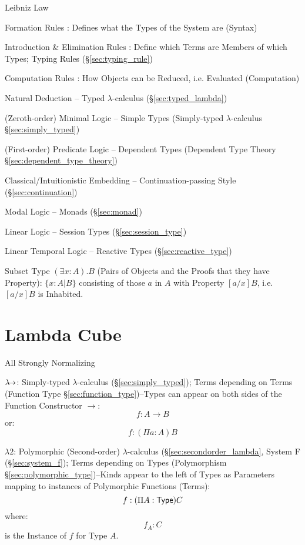 Leibniz Law


\asterism


Formation Rules : Defines what the Types of the System are (Syntax)

Introduction \& Elimination Rules : Define which Terms are Members of
which Types; Typing Rules (\S\ref{sec:typing_rule})

Computation Rules : How Objects can be Reduced, i.e. Evaluated
(Computation)

Natural Deduction -- Typed $\lambda$-calculus
(\S\ref{sec:typed_lambda})

(Zeroth-order) Minimal Logic -- Simple Types (Simply-typed
$\lambda$-calculus \S\ref{sec:simply_typed})

(First-order) Predicate Logic -- Dependent Types (Dependent Type
Theory \S\ref{sec:dependent_type_theory})

Classical/Intuitionistic Embedding -- Continuation-passing Style
(\S\ref{sec:continuation})

Modal Logic -- Monads (\S\ref{sec:monad})

Linear Logic -- Session Types (\S\ref{sec:session_type})

Linear Temporal Logic -- Reactive Types (\S\ref{sec:reactive_type})

Subset Type $(\exists x:A).B$ (Pairs of Objects and the Proofs that
they have Property): $\{ x : A | B \}$ consisting of those $a$ in $A$
with Property $[a/x]B$, i.e. $[a/x]B$ is Inhabited.



\section{Lambda Cube}\label{sec:lambda_cube}

All Strongly Normalizing

$\lambda\kern-5pt\rightarrow$: Simply-typed $\lambda$-calculus
(\S\ref{sec:simply_typed}); Terms depending on Terms (Function Type
\S\ref{sec:function_type})--Types can appear on both sides of the
Function Constructor $\rightarrow$:
\[
  f:A \rightarrow B
\]
or:
\[
  f:(\Pi a:A)B
\]

$\lambda2$: Polymorphic (Second-order) $\lambda$-calculus
(\S\ref{sec:secondorder_lambda}, System F (\S\ref{sec:system_f});
Terms depending on Types (Polymorphism
\S\ref{sec:polymorphic_type})--Kinds appear to the left of Types as
Parameters mapping to instances of Polymorphic Functions (Terms):
\[
  f:(\Pi A:\mathsf{Type}) C
\]
where:
\[
  f_A : C
\]
is the Instance of $f$ for Type $A$.

